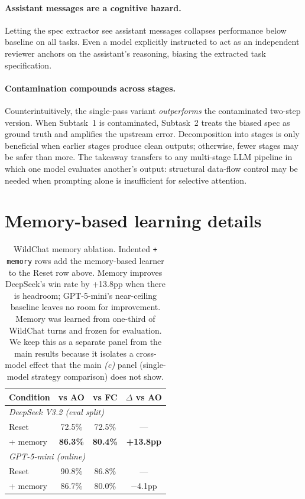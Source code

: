 \documentclass{article}
\begin{document}
\paragraph{Assistant messages are a cognitive hazard.} Letting the spec extractor see assistant messages collapses performance below baseline on all tasks. Even a model explicitly instructed to act as an independent reviewer anchors on the assistant's reasoning, biasing the extracted task specification.

\paragraph{Contamination compounds across stages.} Counterintuitively, the single-pass variant \emph{outperforms} the contaminated two-step version. When Subtask~1 is contaminated, Subtask~2 treats the biased spec as ground truth and amplifies the upstream error. Decomposition into stages is only beneficial when earlier stages produce clean outputs; otherwise, fewer stages may be safer than more. The takeaway transfers to any multi-stage LLM pipeline in which one model evaluates another's output: structural data-flow control may be needed when prompting alone is insufficient for selective attention.

\section{Memory-based learning details}
\label{app:memory-details}

\begin{table}[h]
\centering
\begin{tabular}{lccc}
\toprule
\textbf{Condition} & \textbf{vs AO} & \textbf{vs FC} & \textbf{$\Delta$ vs AO} \\
\midrule
\multicolumn{4}{l}{\emph{DeepSeek V3.2 (eval split)}} \\
\quad Reset & 72.5\% & 72.5\% & --- \\
\quad\quad + memory & \textbf{86.3\%} & \textbf{80.4\%} & \textbf{+13.8pp} \\
\midrule
\multicolumn{4}{l}{\emph{GPT-5-mini (online)}} \\
\quad Reset & 90.8\% & 86.8\% & --- \\
\quad\quad + memory & 86.7\% & 80.0\% & $-$4.1pp \\
\bottomrule
\end{tabular}
\caption{WildChat memory ablation. Indented \texttt{+ memory} rows add the memory-based learner to the Reset row above. Memory improves DeepSeek's win rate by +13.8pp when there is headroom; GPT-5-mini's near-ceiling baseline leaves no room for improvement. Memory was learned from one-third of WildChat turns and frozen for evaluation. We keep this as a separate panel from the main results because it isolates a cross-model effect that the main \emph{(c)} panel (single-model strategy comparison) does not show.}
\label{tab:wildchat-memory}
\end{table}
\end{document}

